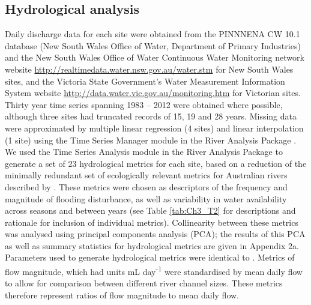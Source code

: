 \subsection{Hydrological analysis}
Daily discharge data for each site were obtained from the PINNNENA CW 10.1 database (New South Wales Office of Water, Department of Primary Industries) and the New South Wales Office of Water Continuous Water Monitoring network website \url{http://realtimedata.water.nsw.gov.au/water.stm} for New South Wales sites, and the Victoria State Government’s Water Measurement Information System website \url{http://data.water.vic.gov.au/monitoring.htm} for Victorian sites.  Thirty year time series spanning 1983 – 2012 were obtained where possible, although three sites had truncated records of 15, 19 and 28 years. Missing data were approximated by multiple linear regression (4 sites) and linear interpolation (1 site) using the Time Series Manager module in the River Analysis Package \citep{marsh2003river}.  We used the Time Series Analysis module in the River Analysis Package to generate a set of 23 hydrological metrics for each site, based on a reduction of the minimally redundant set of ecologically relevant metrics for Australian rivers described by \citet{Kennard2010}. These metrics were chosen as descriptors of the frequency and magnitude of flooding disturbance, as well as variability in water availability across seasons and between years (see Table \ref{tab:Ch3_T2} for descriptions and rationale for inclusion of individual metrics). Collinearity between these metrics was analysed using principal components analysis (PCA); the results of this PCA as well as summary statistics for hydrological metrics are given in Appendix 2a. Parameters used to generate hydrological metrics were identical to \citet{Lawson2015}. Metrics of flow magnitude, which had units mL day\textsuperscript{-1} were standardised by mean daily flow to allow for comparison between different river channel sizes. These metrics therefore represent ratios of flow magnitude to mean daily flow.

